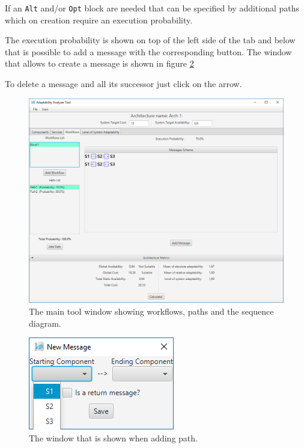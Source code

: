 If an \texttt{Alt} and/or \texttt{Opt} block are needed that can be specified by additional paths which on creation require an execution probability.

The execution probability is shown on top of the left side of the tab and below that is possible to add a message with the corresponding button. The window that allows to create a message is shown in figure \ref{fig:message}

To delete a message and all its successor just click on the arrow.

\begin{figure}[!h]
	\centerline
	{\includegraphics[scale=0.50]{img/work1path1.png}}
	\caption[Workflows tab]{The main tool window showing workflows, paths and the sequence diagram.}
	\label{fig:workflow-path1}
\end{figure}

\begin{figure}[!h]
	\centerline
	{\includegraphics[scale=0.6]{img/message.png}}
	\caption[Add path window]{The window that is shown when adding path.}
	\label{fig:message}
\end{figure}

